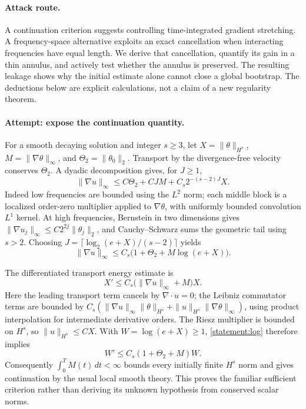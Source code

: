 \documentclass[11pt,a4paper]{article}
\numberwithin{equation}{section}
\begin{document}
\paragraph{Attack route.}
A continuation criterion suggests controlling time-integrated gradient
stretching. A frequency-space alternative exploits an exact cancellation
when interacting frequencies have equal length. We derive that cancellation,
quantify its gain in a thin annulus, and actively test whether the annulus
is preserved. The resulting leakage shows why the initial estimate alone
cannot close a global bootstrap. The deductions below are explicit
calculations, not a claim of a new regularity theorem.

\paragraph{Attempt: expose the continuation quantity.}
For a smooth decaying solution and integer $s\ge3$, let
$X=\|\theta\|_{H^s}$, $M=\|\nabla\theta\|_\infty$, and
$\Theta_2=\|\theta_0\|_2$. Transport by the divergence-free velocity
conserves $\Theta_2$. A dyadic decomposition gives, for $J\ge1$,
\[
 \|\nabla u\|_\infty
 \le C\Theta_2+CJM+C_s2^{-(s-2)J}X.
\]
Indeed low frequencies are bounded using the $L^2$ norm; each middle block
is a localized order-zero multiplier applied to $\nabla\theta$, with
uniformly bounded convolution $L^1$ kernel. At high frequencies, Bernstein
in two dimensions gives
$\|\nabla u_j\|_\infty\le C2^{2j}\|\theta_j\|_2$, and Cauchy--Schwarz
sums the geometric tail using $s>2$.
Choosing $J=\lceil\log_2(e+X)/(s-2)\rceil$ yields
\begin{equation}\label{statement:log}
 \|\nabla u\|_\infty
 \le C_s\bigl(1+\Theta_2+M\log(e+X)\bigr).
\end{equation}

The differentiated transport energy estimate is
\[
 X'\le C_s\bigl(\|\nabla u\|_\infty+M\bigr)X.
\]
Here the leading transport term cancels by $\nabla\cdot u=0$; the
Leibniz commutator terms are bounded by
$C_s(\|\nabla u\|_\infty\|\theta\|_{H^s}
+\|u\|_{H^s}\|\nabla\theta\|_\infty)$, using product interpolation
for intermediate derivative orders. The Riesz multiplier is bounded on
$H^s$, so $\|u\|_{H^s}\le CX$. With $W=\log(e+X)\ge1$,
\eqref{statement:log} therefore implies
\[
 W'\le C_s(1+\Theta_2+M)W.
\]
Consequently $\int_0^TM(t)\,dt<\infty$ bounds every initially finite
$H^s$ norm and gives continuation by the usual local smooth theory. This
proves the familiar sufficient criterion rather than deriving its unknown
hypothesis from conserved scalar norms.
\end{document}
